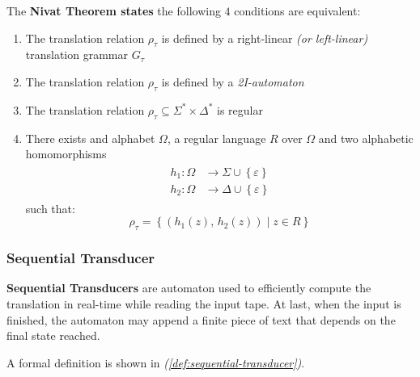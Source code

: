 \documentclass[english]{article}
\begin{document}
\begin{theorem}
  \label{theo:nivat-theorem}
  The \textbf{Nivat Theorem states} the following \(4\) conditions are equivalent:

  \begin{enumerate}
    \item The translation relation \(\rho_\tau\) is defined by a right-linear \textit{(or left-linear)} translation grammar \(G_\tau\)
    \item The translation relation \(\rho_\tau\) is defined by a \textit{2I-automaton}
    \item The translation relation \(\rho_\tau \subseteq \Sigma^\ast \times \Delta^\ast\) is regular
    \item There exists and alphabet \(\Omega\), a regular language \(R\) over \(\Omega\) and two alphabetic homomorphisms
          \begin{gather*}
            \begin{aligned}
              h_1 : \Omega & \rightarrow \Sigma \cup \left\{ \varepsilon \right\} \\
              h_2 : \Omega & \rightarrow \Delta \cup \left\{ \varepsilon \right\}
            \end{aligned}
          \end{gather*}
          such that:
          \[ \rho_\tau = \left\{ \left( h_1(z), \, h_2(z) \right) \mid z \in R \right\} \]
  \end{enumerate}
\end{theorem}

\subsubsection{Sequential Transducer}

\textbf{Sequential Transducers} are automaton used to efficiently compute the translation in real-time while reading the input tape.
At last, when the input is finished, the automaton may append a finite piece of text that depends on the final state reached.

A formal definition is shown in \textit{(\ref{def:sequential-transducer})}.
\end{document}
